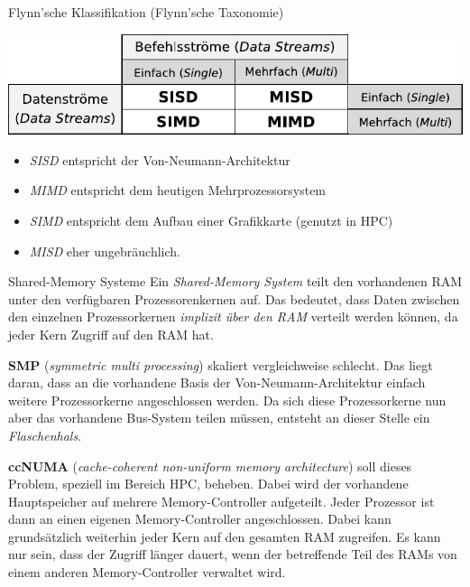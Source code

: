 \documentclass[german]{spicker}
\begin{document}
\begin{defi}{Flynn'sche Klassifikation (Flynn'sche Taxonomie)}
    \begin{center}
        \includegraphics[]{images/flynn.pdf}
    \end{center}

    \begin{itemize}
        \item \emph{SISD} entspricht der Von-Neumann-Architektur
        \item \emph{MIMD} entspricht dem heutigen Mehrprozessorsystem
        \item \emph{SIMD} entspricht dem Aufbau einer Grafikkarte (genutzt in HPC)
        \item \emph{MISD} eher ungebräuchlich.
    \end{itemize}
\end{defi}

\begin{defi}{Shared-Memory Systeme}
    Ein \emph{Shared-Memory System} teilt den vorhandenen RAM unter den verfügbaren Prozessorenkernen auf.
    Das bedeutet, dass Daten zwischen den einzelnen Prozessorkernen \emph{implizit über den RAM} verteilt werden können, da
    jeder Kern Zugriff auf den RAM hat.

    \textbf{SMP} (\emph{symmetric multi processing}) skaliert vergleichweise schlecht.
    Das liegt daran, dass an die vorhandene Basis der Von-Neumann-Architektur einfach
    weitere Prozessorkerne angeschlossen werden. Da sich diese Prozessorkerne
    nun aber das vorhandene Bus-System teilen müssen, entsteht an dieser Stelle ein
    \emph{Flaschenhals}.

    \textbf{ccNUMA} (\emph{cache-coherent non-uniform memory architecture}) soll dieses Problem, speziell im Bereich HPC, beheben.
    Dabei wird der vorhandene Hauptspeicher auf mehrere Memory-Controller aufgeteilt.
    Jeder Prozessor ist dann an einen eigenen Memory-Controller angeschlossen.
    Dabei kann grundsätzlich weiterhin jeder Kern auf den gesamten RAM zugreifen.
    Es kann nur sein, dass der Zugriff länger dauert, wenn der betreffende Teil des RAMs von einem anderen Memory-Controller verwaltet wird.
\end{defi}
\end{document}
